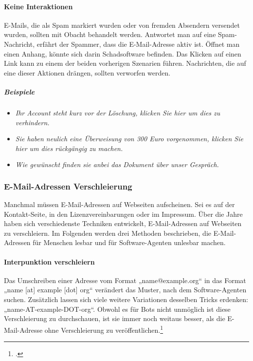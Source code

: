 \paragraph{Keine Interaktionen}
\label{par:keine-interaktionen}

E-Mails, die als Spam markiert wurden oder von fremden Absendern versendet
wurden, sollten mit Obacht behandelt werden. Antwortet man auf eine
Spam-Nachricht, erfährt der Spammer, dass die E-Mail-Adresse aktiv ist. Öffnet
man einen Anhang, könnte sich darin Schadsoftware befinden. Das Klicken auf
einen Link kann zu einem der beiden vorherigen Szenarien führen. Nachrichten,
die auf eine dieser Aktionen drängen, sollten verworfen werden.

\subparagraph{Beispiele}
\label{spar:beispiele}

\begin{itemize}
\tightlist
\item
  \emph{Ihr Account steht kurz vor der Löschung, klicken Sie hier um dies zu
  verhindern.}
\item
  \emph{Sie haben neulich eine Überweisung von 300 Euro vorgenommen, klicken
  Sie hier um dies rückgängig zu machen.}
\item
  \emph{Wie gewünscht finden sie anbei das Dokument über unser Gespräch.}
\end{itemize}

\subsubsection{E-Mail-Adressen Verschleierung}
\label{ssub:e-mail-adressen-verschleierung}

Manchmal müssen E-Mail-Adressen auf Webseiten aufscheinen. Sei es auf der
Kontakt-Seite, in den Lizenzvereinbarungen oder im Impressum. Über die Jahre
haben sich verschiedenste Techniken entwickelt, E-Mail-Adressen auf Webseiten
zu verschleiern. Im Folgenden werden drei Methoden beschrieben, die
E-Mail-Adressen für Menschen lesbar und für Software-Agenten unlesbar machen.

\paragraph{Interpunktion verschleiern}
\label{par:interpunktion-verschleiern}

Das Umschreiben einer Adresse vom Format „name@example.org“ in das Format „name
{[}at{]} example {[}dot{]} org“ verändert das Muster, nach dem Software-Agenten
suchen. Zusätzlich lassen sich viele weitere Variationen desselben Tricks
erdenken: „name-AT-example-DOT-org“. Obwohl es für Bots nicht unmöglich ist
diese Verschleierung zu durchschauen, ist sie immer noch weitaus besser, als
die E-Mail-Adresse ohne Verschleierung zu
veröffentlichen.\footcite{obfuscateEmailAddresses}

